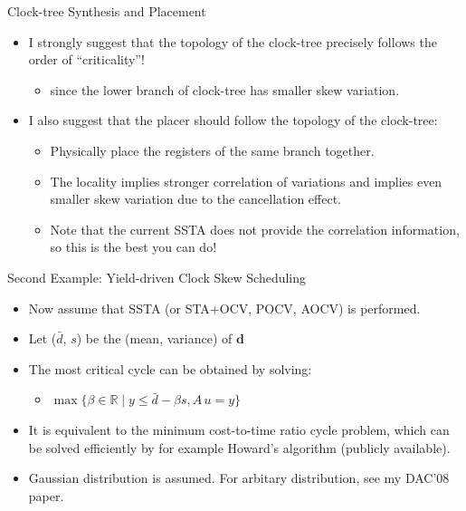 \documentclass[10pt,ignorenonframetext,mathserif]{beamer}
\providecommand{\tightlist}{%
  \setlength{\itemsep}{0pt}\setlength{\parskip}{0pt}}
\begin{document}
\begin{frame}{Clock-tree Synthesis and Placement}

\begin{itemize}
\tightlist
\item
  I strongly suggest that the topology of the clock-tree precisely
  follows the order of ``criticality''!

  \begin{itemize}
  \tightlist
  \item
    since the lower branch of clock-tree has smaller skew variation.
  \end{itemize}
\item
  I also suggest that the placer should follow the topology of the
  clock-tree:

  \begin{itemize}
  \tightlist
  \item
    Physically place the registers of the same branch together.
  \item
    The locality implies stronger correlation of variations and implies
    even smaller skew variation due to the cancellation effect.
  \item
    Note that the current SSTA does not provide the correlation
    information, so this is the best you can do!
  \end{itemize}
\end{itemize}

\end{frame}

\begin{frame}{Second Example: Yield-driven Clock Skew Scheduling}

\begin{itemize}
\tightlist
\item
  Now assume that SSTA (or STA+OCV, POCV, AOCV) is performed.
\item
  Let (\(\bar{d}\), \(s\)) be the (mean, variance) of \(\mathbf{d}\)
\item
  The most critical cycle can be obtained by solving:

  \begin{itemize}
  \tightlist
  \item
    \(\max\{\beta \in \mathbb{R} \mid y \leq \bar{d} - \beta s, A\,u = y\}\)
  \end{itemize}
\item
  It is equivalent to the minimum cost-to-time ratio cycle problem,
  which can be solved efficiently by for example Howard's algorithm
  (publicly available).
\item
  Gaussian distribution is assumed. For arbitary distribution, see my
  DAC'08 paper.
\end{itemize}

\end{frame}
\end{document}
